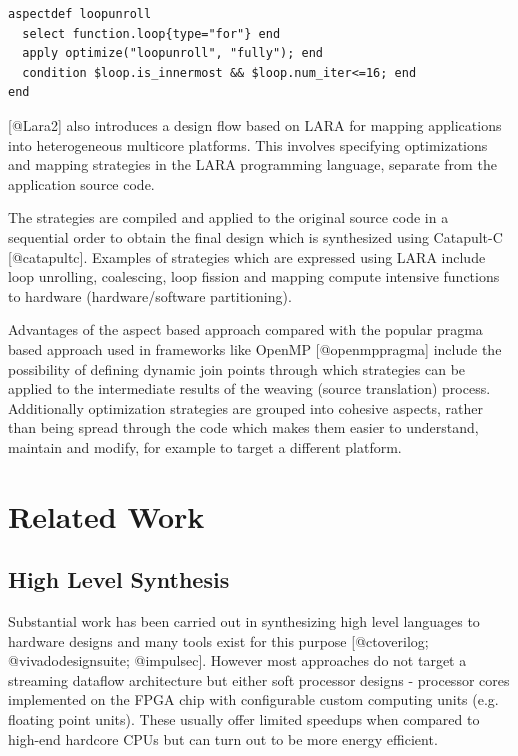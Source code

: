 \begin{lstlisting}
aspectdef loopunroll
  select function.loop{type="for"} end
  apply optimize("loopunroll", "fully"); end
  condition $loop.is_innermost && $loop.num_iter<=16; end
end
\end{lstlisting}

[@Lara2] also introduces a design flow based on LARA for mapping
applications into heterogeneous multicore platforms. This involves
specifying optimizations and mapping strategies in the LARA
programming language, separate from the application source code.

The strategies are compiled and applied to the original source code in
a sequential order to obtain the final design which is synthesized
using Catapult-C [@catapultc]. Examples of strategies which are
expressed using LARA include loop unrolling, coalescing, loop fission
and mapping compute intensive functions to hardware (hardware/software
partitioning).

Advantages of the aspect based approach compared with the popular
pragma based approach used in frameworks like OpenMP [@openmppragma]
include the possibility of defining dynamic join points through which
strategies can be applied to the intermediate results of the weaving
(source translation) process. Additionally optimization strategies are
grouped into cohesive aspects, rather than being spread through the
code which makes them easier to understand, maintain and modify, for
example to target a different platform.


\section{Related Work}

\subsection{High Level Synthesis}

Substantial work has been carried out in synthesizing high level
languages to hardware designs and many tools exist for this purpose
[@ctoverilog; @vivadodesignsuite; @impulsec]. However most approaches
do not target a streaming dataflow architecture but either soft
processor designs - processor cores implemented on the FPGA chip with
configurable custom computing units (e.g. floating point units). These
usually offer limited speedups when compared to high-end hardcore
CPUs but can turn out to be more energy efficient.


